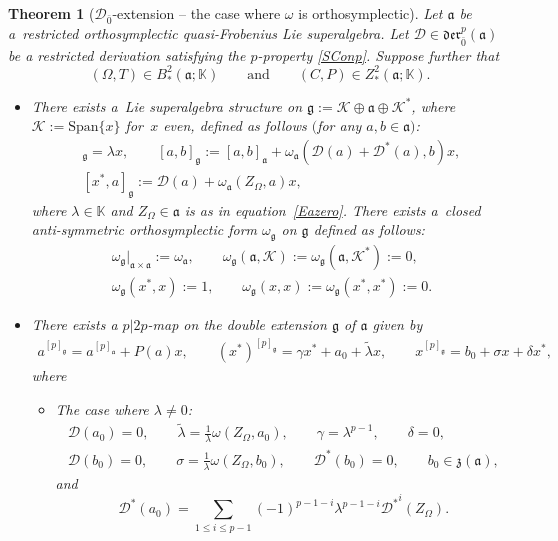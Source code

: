 \documentclass[10pt,a4paper]{amsart}
\numberwithin{equation}{section}
\newtheorem{Theorem}{Theorem}[section]
\begin{document}
\begin{Theorem}[${\mathscr D}_{\bar 0}$-extension -- the case where $\omega$ is orthosymplectic]\label{MainTh} Let $\mathfrak{a}$ be a~restricted orthosymplectic quasi-Frobenius Lie superalgebra. Let ${\mathscr D}\in \mathfrak{der}_{\bar 0}^p(\mathfrak{a})$ be a restricted derivation satisfying the $p$-property \eqref{SConp}. Suppose further that
\[
(\Omega,T) \in B^2_*(\mathfrak{a}; \mathbb{K}) \qquad \text{and} \qquad (C, P)\in Z^2_*(\mathfrak{a}; \mathbb{K}).
\]
\begin{itemize}\itemsep=0pt
\item[$(i)$] There exists a~Lie superalgebra structure on $\mathfrak{g}:=\mathscr{K} \oplus \mathfrak{a} \oplus \mathscr{K} ^*$, where $\mathscr{K} :=\mathrm{Span}\{x\}$ for~$x$ even, defined as follows $($for any $a, b\in \mathfrak{a})$:
\begin{gather*}
[x ,x^*]_\mathfrak{g}=\lambda x, \qquad [a,b]_\mathfrak{g} := [a,b]_\mathfrak{a} + \omega_\mathfrak{a}( {\mathscr D}(a)+{\mathscr D}^*(a), b)x, \\
 [x^*,a]_\mathfrak{g} := {\mathscr D}(a)+ \omega_\mathfrak{a}(Z_\Omega,a)x,
\end{gather*}
where $\lambda\in \mathbb{K}$ and $Z_\Omega\in \mathfrak{a}$ is as in equation~\eqref{Eazero}. There exists a~closed anti-symmetric orthosymplectic form $\omega_\mathfrak{g}$ on $\mathfrak{g}$ defined as follows:
\begin{gather*}
{\omega_\mathfrak{g}}\vert_{\mathfrak{a} \times \mathfrak{a}}:= \omega_\mathfrak{a}, \qquad \omega_\mathfrak{g}(\mathfrak{a},\mathscr{K} ):=\omega_\mathfrak{g}(\mathfrak{a},\mathscr{K} ^*):=0, \\ \omega_\mathfrak{g}(x^*,x):=1, \qquad
\omega_\mathfrak{g}(x,x):=\omega_\mathfrak{g}(x^*,x^*) :=0.
\end{gather*}
\item[$(ii)$] There exists a $p|2p$-map on the double extension $\mathfrak{g}$ of $\mathfrak{a}$ given by
\begin{gather*}
a^{[p]_\mathfrak{g}} = a^{[p]_\mathfrak{a}} +P(a) x,\qquad
(x^*)^{[p]_\mathfrak{g}} = \gamma x^*+ a_0 + \tilde \lambda x,\qquad
x^{[p]_\mathfrak{g}} = b_0+ \sigma x +\delta x^*,
\end{gather*}
where
\begin{itemize}\itemsep=0pt
\item[$(a)$] The case where $\lambda\not =0$:
\begin{gather*}
 {\mathscr D}(a_0) = 0, \qquad \tilde \lambda = \frac{1}{\lambda} \omega(Z_\Omega, a_0), \qquad\gamma = \lambda^{p-1}, \qquad \delta=0, \\
 {\mathscr D}(b_0) = 0, \qquad \sigma = \frac{1}{\lambda} \omega(Z_\Omega, b_0), \qquad{\mathscr D}^*(b_0) = 0, \qquad b_0\in {\mathfrak z}(\mathfrak{a}),
\end{gather*}
and
\begin{equation}
\label{eqst1}
{\mathscr D}^*(a_0)=\sum_{1\leq i \leq p-1} (-1)^{p-1-i} \lambda^{p-1-i} {{\mathscr D}^*}^i(Z_\Omega).
\end{equation}


\end{itemize}
\end{itemize}
\end{Theorem}
\end{document}
